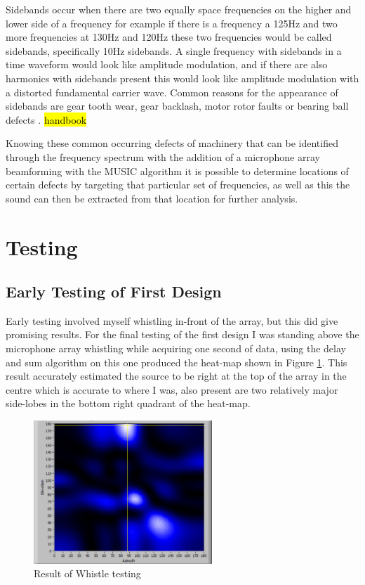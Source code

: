 \documentclass{UoNMCHA}
\numberwithin{equation}{section}
\begin{document}
Sidebands occur when there are two equally space frequencies on the higher and lower side of a frequency for example if there is a frequency a 125Hz and two more frequencies at 130Hz and 120Hz these two frequencies would be called sidebands, specifically 10Hz sidebands. A single frequency with sidebands in a time waveform would look like amplitude modulation, and if there are also harmonics with sidebands present this would look like amplitude modulation with a distorted fundamental carrier wave. Common reasons for the appearance of sidebands are gear tooth wear, gear backlash, motor rotor faults or bearing ball defects \citep{Mob20}. \hl{handbook}

Knowing these common occurring defects of machinery that can be identified through the frequency spectrum with the addition of a microphone array beamforming with the MUSIC algorithm it is possible to determine locations of certain defects by targeting that particular set of frequencies, as well as this the sound can then be extracted from that location for further analysis. 

\newpage
\section{Testing} \label{sec:Lab Testing}
\subsection{Early Testing of First Design} \label{sec:First Array Testing}
    Early testing  involved myself whistling in-front of the array, but this did give promising results. For the final testing of the first design I was standing above the microphone array whistling while acquiring one second of data, using the delay and sum algorithm on this one produced the heat-map shown in Figure \ref{fig:RealWhistle}. This result accurately estimated the source to be right at the top of the array in the centre which is accurate to where I was, also present are two relatively major side-lobes in the bottom right quadrant of the heat-map.
    
    \begin{figure} [H]
        \centering
        \includegraphics[keepaspectratio, width = 0.6\textwidth]{Figures/RealWhistle.png}
        \caption{Result of Whistle testing}
        \label{fig:RealWhistle}
    \end{figure}
    
\end{document}
